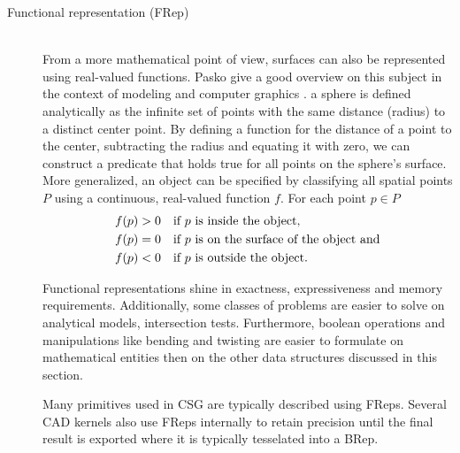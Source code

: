 \begin{description}
	\item[Functional representation (FRep)] \hfill \\
	From a more mathematical point of view, surfaces can also be represented using real-valued functions.
	Pasko \etal give a good overview on this subject in the context of modeling and computer graphics \cite{frep}.
	\Eg a sphere is defined analytically as the infinite set of points with the same distance (radius) to a distinct center point.
	By defining a function for the distance of a point to the center, subtracting the radius and equating it with zero, we can construct a predicate that holds true for all points on the sphere's surface.
	More generalized, an object can be specified by classifying all spatial points $P$ using a continuous, real-valued function $f$. For each point $p \in P$
	\begin{align}
		f(p) &> 0 \quad \text{if $p$ is inside the object,}               \notag \\
		f(p) &= 0 \quad \text{if $p$ is on the surface of the object and} \notag \\
		f(p) &< 0 \quad \text{if $p$ is outside the object.}              \notag
	\end{align}
	
	Functional representations shine in exactness, expressiveness and memory requirements.
	Additionally, some classes of problems are easier to solve on analytical models, \eg intersection tests.
	Furthermore, boolean operations and manipulations like bending and twisting are easier to formulate on mathematical entities then on the other data structures discussed in this section.
	
	Many primitives used in CSG are typically described using FReps.
	Several CAD kernels also use FReps internally to retain precision until the final result is exported where it is typically tesselated into a BRep.
	
\end{description}
